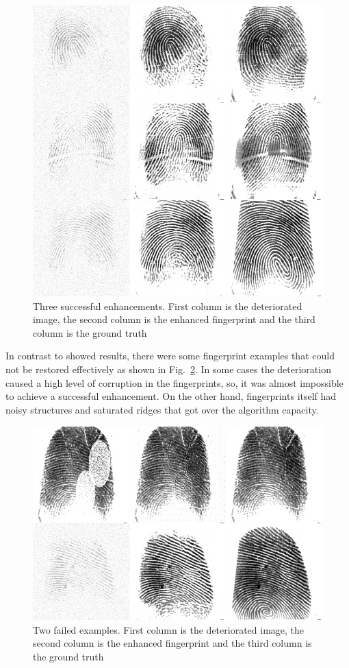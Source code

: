 \documentclass[a4paper,fleqn]{cas-dc}
\begin{document}
\begin{figure}[htbp]
\centerline{\includegraphics[scale=0.28]{figs/recons_2.png}}
\caption{Three successful enhancements. First column is the deteriorated image, the second column is the enhanced fingerprint and the third column is the ground truth}
\label{fig7}
\end{figure}

In contrast to showed results, there were some fingerprint examples that could not be restored effectively as shown in Fig.~\ref{fig8}. In some cases the deterioration caused a high level of corruption in the fingerprints, so, it was almost impossible to achieve a successful enhancement. On the other hand, fingerprints itself had noisy structures and saturated ridges that got over the algorithm capacity.

\begin{figure}[htbp]
\centerline{\includegraphics[scale=0.28]{figs/recons_failed.png}}
\caption{Two failed examples. First column is the deteriorated image, the second column is the enhanced fingerprint and the third column is the ground truth}
\label{fig8}
\end{figure}
\end{document}
